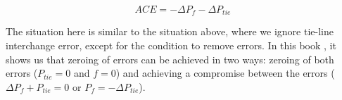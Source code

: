 \begin{equation} \label{eq2}
ACE = - \Delta P_f - \Delta P_{tie}
\end{equation}


The situation here is similar to the situation above, where we ignore tie-line interchange error, except for the condition to remove errors. In this book \cite{machowski2011power}, it shows us that zeroing of errors can be achieved in two ways: zeroing of both errors ($ P_{tie} = 0 $ and $ f = 0 $) and achieving a compromise between the errors ($\Delta P_f + P_{tie} = 0$ or $P_f = - \Delta P_{tie}$). \\
